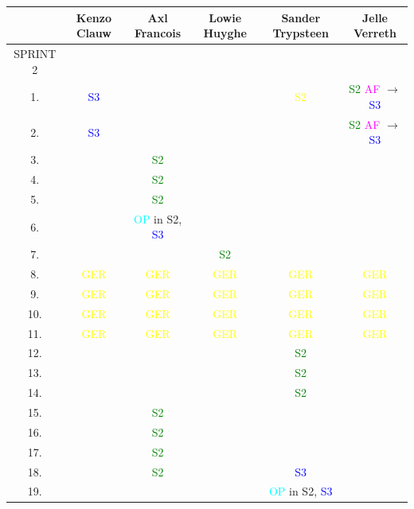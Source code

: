 \documentclass[pdftex,a4paper,12pt,twoside]{report}
\begin{document}
\newpage 
\begin{tabular}{|c|c|c|c|c|c|}
\hline  & Kenzo Clauw & Axl Francois & Lowie Huyghe & Sander Trypsteen & Jelle Verreth \\ 
\hline SPRINT 2 &  &  &  &  &  \\
\hline 1. & \textcolor{blue}{S3} &  &  & \textcolor{yellow}{S2} & \textcolor{green}{S2} \textcolor{magenta}{AF} $\rightarrow$ \textcolor{blue}{S3}  \\ 
\hline 2. & \textcolor{blue}{S3}  &  &  &  & \textcolor{green}{S2} \textcolor{magenta}{AF} $\rightarrow$ \textcolor{blue}{S3}  \\ 
\hline 3.  &  & \textcolor{green}{S2}  &  &  &  \\
\hline 4.  &  & \textcolor{green}{S2}  &  &  &  \\
\hline 5.  &  & \textcolor{green}{S2} &  &  &  \\
\hline 6.  &  &\textcolor{cyan}{OP} in S2, \textcolor{blue}{S3}  &  &  &  \\
\hline 7.  &  &  & \textcolor{green}{S2} &  &  \\
\hline 8. & \textcolor{yellow}{GER} & \textcolor{yellow}{GER}  &\textcolor{yellow}{GER}  & \textcolor{yellow}{GER} & \textcolor{yellow}{GER} \\
\hline 9. & \textcolor{yellow}{GER} & \textcolor{yellow}{GER}  &\textcolor{yellow}{GER}  & \textcolor{yellow}{GER} & \textcolor{yellow}{GER} \\
\hline 10. & \textcolor{yellow}{GER} & \textcolor{yellow}{GER}  &\textcolor{yellow}{GER}  & \textcolor{yellow}{GER} & \textcolor{yellow}{GER} \\
\hline 11.& \textcolor{yellow}{GER} & \textcolor{yellow}{GER}  &\textcolor{yellow}{GER}  & \textcolor{yellow}{GER} & \textcolor{yellow}{GER} \\
\hline 12. &  &  &  & \textcolor{green}{S2}  &  \\ 
\hline 13.  &  &  &  &\textcolor{green}{S2}   &  \\
\hline 14.  &  &  &  &\textcolor{green}{S2}   &  \\
\hline 15.  &  & \textcolor{green}{S2}  &  &  &  \\
\hline 16.  &  & \textcolor{green}{S2}  &  &  &  \\
\hline 17.  &  & \textcolor{green}{S2}  &  &  &  \\
\hline 18.  &  & \textcolor{green}{S2}  &  &  \textcolor{blue}{S3}  &  \\
\hline 19. &  &  &  & \textcolor{cyan}{OP} in S2, \textcolor{blue}{S3} &  \\

\end{tabular}
\end{document}
